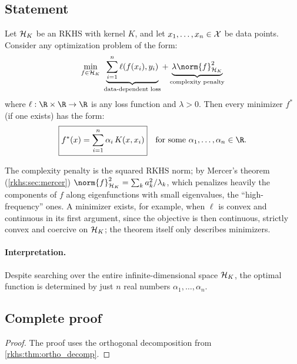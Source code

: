 \begin{notechapter}
\subsection{Statement}

\begin{theorem}
\label{rkhs:thm:representer}
Let $\mathcal{H}_K$ be an RKHS with kernel $K$, and let $x_1, \ldots, x_n \in \mathcal{X}$
be data points. Consider any optimization problem of the form:
\begin{equation}
\label{rkhs:eq:representer_problem}
\min_{f \in \hk}\;
\underbrace{\sum_{i=1}^n \ell(f(x_i), y_i)}_{\text{data-dependent loss}}
+ \underbrace{
  \lambda \norm{f}_{\hk}^2}_{\text{complexity penalty}}
\end{equation}
where $\ell: \R \times \R \to \R$ is any loss function and $\lambda >
0$. Then every minimizer $f^*$ (if one exists) has the form:
\begin{equation}
\label{rkhs:eq:representer_solution}
\boxed{f^*(x) = \sum_{i=1}^n \alpha_i\, K(x, x_i)} \quad \text{for some } \alpha_1, \ldots, \alpha_n \in \R.
\end{equation}
\end{theorem}

The complexity penalty is the squared RKHS norm; by Mercer's theorem (\cref{rkhs:sec:mercer}) $\norm{f}_{\hk}^2 = \sum_k a_k^2/\lambda_k$, which penalizes heavily the components of $f$ along eigenfunctions with small eigenvalues, the ``high-frequency'' ones. A minimizer exists, for example, when $\ell$ is convex and continuous in its first argument, since the objective is then continuous, strictly convex and coercive on $\mathcal{H}_K$; the theorem itself only describes minimizers.

\paragraph{Interpretation.} Despite searching over the entire
infinite-dimensional space $\mathcal{H}_K$, the optimal function is determined by
just $n$ real numbers $\alpha_1, \ldots, \alpha_n$.

\subsection{Complete proof}

\begin{proof}
The proof uses the orthogonal decomposition from \cref{rkhs:thm:ortho_decomp}.


\end{proof}
\end{notechapter}
